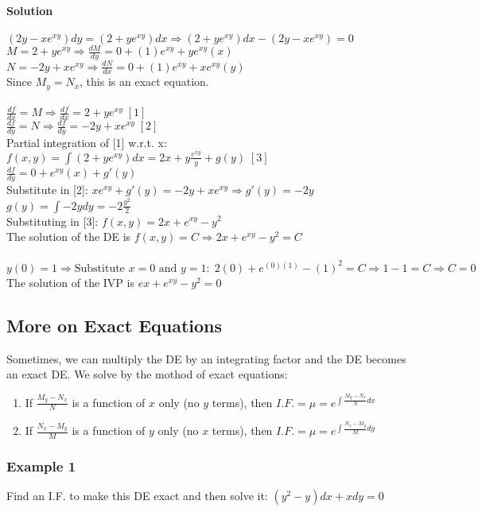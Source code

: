 \documentclass{article}
\begin{document}
\paragraph{Solution} $(2y-xe^{xy})dy=(2+ye^{xy})dx\Rightarrow(2+ye^{xy})dx-(2y-xe^{xy})=0$
\\$M=2+ye^{xy}\Rightarrow\frac{dM}{dy}=0+(1)e^{xy}+ye^{xy}(x)$
\\$N=-2y+xe^{xy}\Rightarrow\frac{dN}{dx}=0+(1)e^{xy}+xe^{xy}(y)$
\\Since $M_y=N_x$, this is an exact equation.
\\\\$\frac{df}{dx}=M\Rightarrow\frac{df}{dx}=2+ye^{xy}\;[1]$
\\$\frac{df}{dy}=N\Rightarrow\frac{df}{dy}=-2y+xe^{xy}\;[2]$
\\Partial integration of [1] w.r.t. x: $f(x,y)=\int(2+ye^{xy})dx=2x+y\frac{e^{xy}}{y}+g(y)\;[3]$
\\$\frac{df}{dy}=0+e^{xy}(x)+g'(y)$
\\Substitute in [2]: $xe^{xy}+g'(y)=-2y+xe^{xy}\Rightarrow g'(y)=-2y$
\\$g(y)=\int -2ydy=-2\frac{y^2}{2}$
\\Substituting in [3]: $f(x,y)=2x+e^{xy}-y^2$
\\The solution of the DE is $f(x,y)=C\Rightarrow2x+e^{xy}-y^2=C$
\\\\$y(0)=1\Rightarrow\text{Substitute }x=0\text{ and }y=1:\;2(0)+e^{(0)(1)}-(1)^2=C\Rightarrow1-1=C\Rightarrow C=0$
\\The solution of the IVP is $ex+e^{xy}-y^2=0$

\subsection{More on Exact Equations}
Sometimes, we can multiply the DE by an integrating factor and the DE becomes an exact DE. We solve by the mothod of exact equations:
\begin{enumerate}
    \itemsep 0em
    \item If $\frac{M_y-N_x}{N}$ is a function of $x$ only (no $y$ terms), then $I.F.=\mu=e^{\int\frac{M_y-N_x}{N}dx}$
    \item If $\frac{N_x-M_y}{M}$ is a function of $y$ only (no $x$ terms), then $I.F.=\mu=e^{\int\frac{N_x-M_y}{M}dy}$
\end{enumerate}

\subsubsection{Example 1}
Find an I.F. to make this DE exact and then solve it: $(y^2-y)dx+xdy=0$
\end{document}
